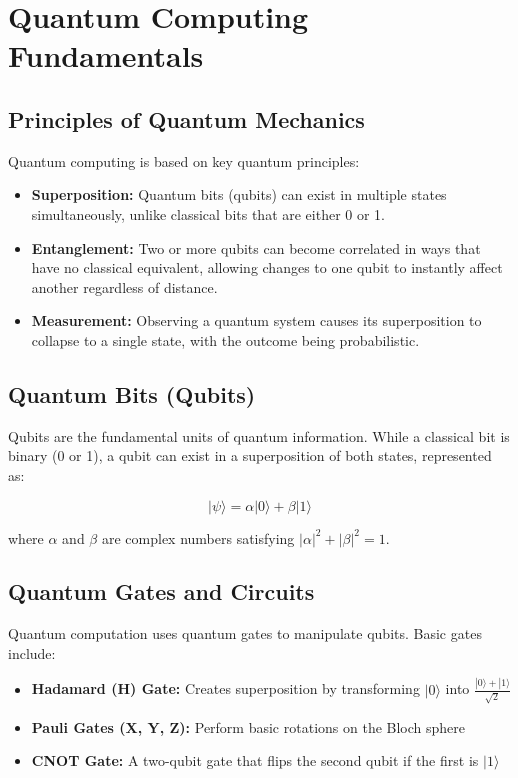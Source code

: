\chapter{Quantum Computing Fundamentals}

\section{Principles of Quantum Mechanics}
Quantum computing is based on key quantum principles:

\begin{itemize}
    \item \textbf{Superposition:} Quantum bits (qubits) can exist in multiple states simultaneously, unlike classical bits that are either 0 or 1.
    
    \item \textbf{Entanglement:} Two or more qubits can become correlated in ways that have no classical equivalent, allowing changes to one qubit to instantly affect another regardless of distance.
    
    \item \textbf{Measurement:} Observing a quantum system causes its superposition to collapse to a single state, with the outcome being probabilistic.
\end{itemize}

\section{Quantum Bits (Qubits)}
Qubits are the fundamental units of quantum information. While a classical bit is binary (0 or 1), a qubit can exist in a superposition of both states, represented as:

\begin{equation}
|\psi\rangle = \alpha|0\rangle + \beta|1\rangle
\end{equation}

where $\alpha$ and $\beta$ are complex numbers satisfying $|\alpha|^2 + |\beta|^2 = 1$.

\section{Quantum Gates and Circuits}
Quantum computation uses quantum gates to manipulate qubits. Basic gates include:

\begin{itemize}
    \item \textbf{Hadamard (H) Gate:} Creates superposition by transforming $|0\rangle$ into $\frac{|0\rangle + |1\rangle}{\sqrt{2}}$
    
    \item \textbf{Pauli Gates (X, Y, Z):} Perform basic rotations on the Bloch sphere
    
    \item \textbf{CNOT Gate:} A two-qubit gate that flips the second qubit if the first is $|1\rangle$
\end{itemize}


